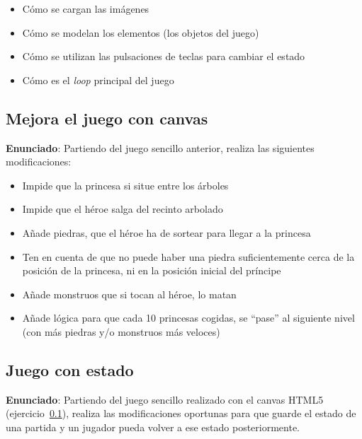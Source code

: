 \begin{itemize}
  \item Cómo se cargan las imágenes
  \item Cómo se modelan los elementos (los objetos del juego)
  \item Cómo se utilizan las pulsaciones de teclas para cambiar el estado
  \item Cómo es el \emph{loop} principal del juego
\end{itemize}

\subsection{Mejora el juego con canvas}
\label{subsec:modifica-juego}

\textbf{Enunciado}: Partiendo del juego sencillo anterior, realiza las 
siguientes modificaciones:

\begin{itemize}
  \item Impide que la princesa si situe entre los árboles
  \item Impide que el héroe salga del recinto arbolado
  \item Añade piedras, que el héroe ha de sortear para llegar a la princesa
  \item Ten en cuenta de que no puede haber una piedra suficientemente cerca de la posición de la princesa, ni en la posición inicial del príncipe
  \item Añade monstruos que si tocan al héroe, lo matan
  \item Añade lógica para que cada 10 princesas cogidas, se ``pase'' al siguiente
nivel (con más piedras y/o monstruos más veloces)
\end{itemize}

\subsection{Juego con estado}
\label{subsec:juego-con-estado}

\textbf{Enunciado}: Partiendo del juego sencillo realizado con el canvas HTML5 (ejercicio~\ref{subsec:modifica-juego}), realiza las modificaciones oportunas para que guarde el estado de una partida y un jugador pueda volver a ese estado posteriormente.

